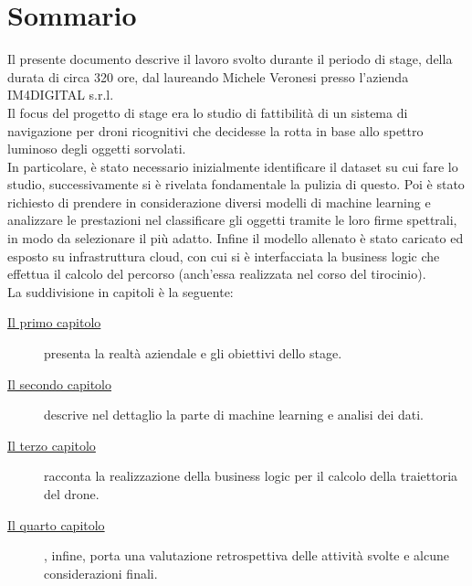 
\cleardoublepage
{}
{}
\begingroup
\let\clearpage\relax
\let\cleardoublepage\relax
\let\cleardoublepage\relax

\chapter*{Sommario}

Il presente documento descrive il lavoro svolto durante il periodo di stage, della durata di circa 320 ore, dal laureando Michele Veronesi presso l'azienda IM4DIGITAL s.r.l.\\
Il focus del progetto di stage era lo studio di fattibilità di un sistema di navigazione per droni ricognitivi che decidesse la rotta in base allo spettro luminoso degli oggetti sorvolati.\\
In particolare, è stato necessario inizialmente identificare il dataset su cui fare lo studio, successivamente si è rivelata fondamentale la pulizia di questo.
Poi è stato richiesto di prendere in considerazione diversi modelli di machine learning e analizzare le prestazioni nel classificare gli oggetti tramite le loro firme spettrali,
in modo da selezionare il più adatto.
Infine il modello allenato è stato caricato ed esposto su infrastruttura cloud, con cui si è interfacciata la business logic che effettua il calcolo del percorso (anch'essa realizzata nel corso del tirocinio).\\
La suddivisione in capitoli è la seguente:
\begin{description}
    \item[{\hyperref[cap:introduzione]{Il primo capitolo}}] presenta la realtà aziendale e gli obiettivi dello stage.
    
    \item[{\hyperref[cap:machine-learning]{Il secondo capitolo}}] descrive nel dettaglio la parte di machine learning e analisi dei dati.
    
    \item[{\hyperref[cap:business-logic]{Il terzo capitolo}}] racconta la realizzazione della business logic per il calcolo della traiettoria del drone.
    
    \item[{\hyperref[cap:conclusione]{Il quarto capitolo}}], infine, porta una valutazione retrospettiva delle attività svolte e alcune considerazioni finali.
\end{description}
%
%

\endgroup			

\vfill

